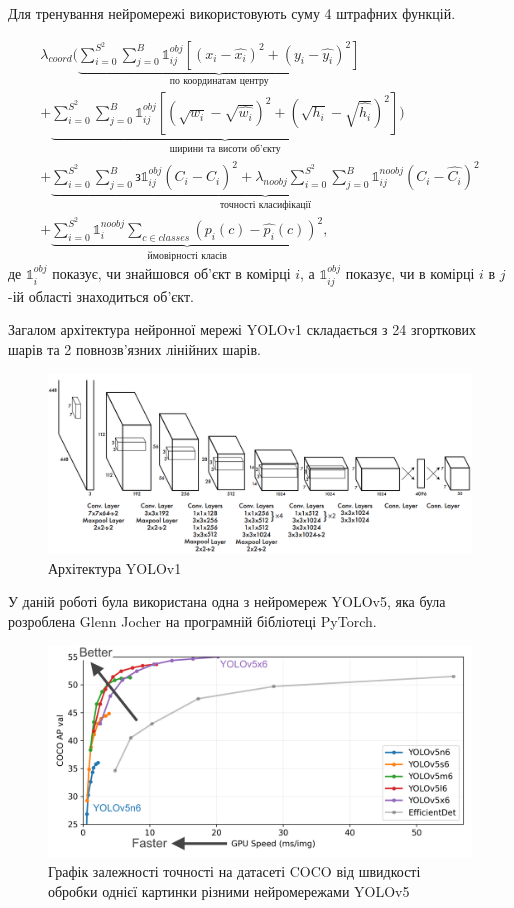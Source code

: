 Для тренування нейромережі використовують суму 4 штрафних функцій.

\begin{multline*}
    \lambda_{coord}(
    \underbrace{ \sum_{i=0}^{S^2} \sum_{j=0}^{B}
    \mathds{1}_{ij}^{obj} [(x_i - \widehat{x_i})^2 + (y_i - \widehat{y_i})^2]
    }_\textrm{по координатам центру}\\
    +
    \underbrace{
    \sum_{i=0}^{S^2} \sum_{j=0}^{B}
    \mathds{1}_{ij}^{obj} [(\sqrt{w_i} - \sqrt{\widehat{w_i}})^2 + (\sqrt{h_i} - \sqrt{\widehat{h_i}})^2]
    }_\textrm{ширини та висоти об'єкту}
    )\\
    +  \underbrace{
        \sum_{i=0}^{S^2} \sum_{j=0}^{B} з
        \mathds{1}_{ij}^{obj} (C_i - \widehat{C_i})^2
        +
        \lambda_{noobj} \sum_{i=0}^{S^2} \sum_{j=0}^{B} \mathds{1}_{ij}^{noobj} (C_i - \widehat{C_i})^2
    }_\textrm{точності класифікації}\\
    +  \underbrace{
    \sum_{i=0}^{S^2} \mathds{1}_{i}^{noobj}\sum_{c \in classes}(p_i(c) -  \widehat{p_i}(c))^2
    }_\textrm{ймовірності класів},
\end{multline*}
де $\mathds{1}_{i}^{obj}$ показує, чи знайшовся об'єкт в комірці $i$, а
$\mathds{1}_{ij}^{obj}$ показує, чи в комірці $i$ в $j$-ій області знаходиться об'єкт.

Загалом архітектура нейронної мережі YOLOv1 складається з 24 згорткових шарів та
2 повнозв'язних лінійних шарів.

\begin{figure}[H]
    \includegraphics[width=0.8\linewidth]{images/cnn_yolo2}
    \centering
    \caption{Архітектура YOLOv1 \cite{yolov1}
    }
\end{figure}

У даній роботі була використана одна з нейромереж YOLOv5, яка була
розроблена Glenn Jocher на програмній бібліотеці PyTorch.

\begin{figure}[H]
    \includegraphics[width=0.5\linewidth]{images/cnn_yolo3}
    \centering
    \caption{Графік залежності точності на датасеті COCO від швидкості обробки однієї
        картинки різними нейромережами YOLOv5
    }
\end{figure}

